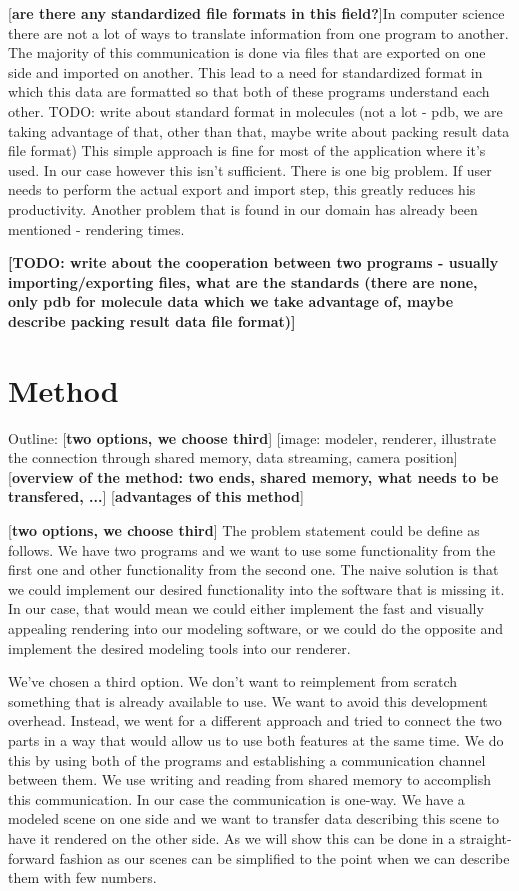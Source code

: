 \documentclass[
  digital, %
  table,   %
  nolof,     %
  nolot,     %
]{fithesis3}
\begin{document}
[\textbf{are there any standardized file formats in this field?}]In computer science there are not a lot of ways to translate information from one program to another. The majority of this communication is done via files that are exported on one side and imported on another. This lead to a need for standardized format in which this data are formatted so that both of these programs understand each other. TODO: write about standard format in molecules (not a lot - pdb, we are taking advantage of that, other than that, maybe write about packing result data file format) This simple approach is fine for most of the application where it's used. In our case however this isn't sufficient. There is one big problem. If user needs to perform the actual export and import step, this greatly reduces his productivity. Another problem that is found in our domain has already been mentioned - rendering times.

\textbf{[TODO: write about the cooperation between two programs - usually importing/exporting files, what are the standards (there are none, only pdb for molecule data which we take advantage of, maybe describe packing result data file format)]}

\chapter{Method}
Outline:
[\textbf{two options, we choose third}]
[image: modeler, renderer, illustrate the connection through shared memory, data streaming, camera position]
[\textbf{overview of the method: two ends, shared memory, what needs to be transfered, ...}]
[\textbf{advantages of this method}]

[\textbf{two options, we choose third}]
The problem statement could be define as follows. We have two programs and we want to use some functionality from the first one and other functionality from the second one. The naive solution is that we could implement our desired functionality into the software that is missing it. In our case, that would mean we could either implement the fast and visually appealing rendering into our modeling software, or we could do the opposite and implement the desired modeling tools into our renderer.

We've chosen a third option. We don't want to reimplement from scratch something that is already available to use. We want to avoid this development overhead. Instead, we went for a different approach and tried to connect the two parts in a way that would allow us to use both features at the same time. We do this by using both of the programs and establishing a communication channel between them. We use writing and reading from shared memory to accomplish this communication. In our case the communication is one-way. We have a modeled scene on one side and we want to transfer data describing this scene to have it rendered on the other side. As we will show this can be done in a straight-forward fashion as our scenes can be simplified to the point when we can describe them with few numbers.
\end{document}
